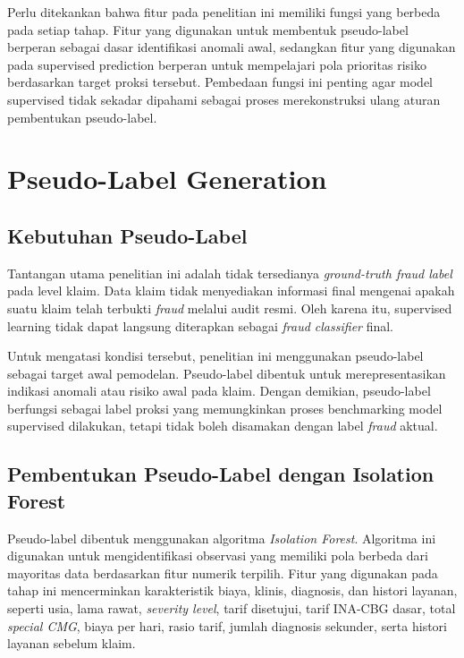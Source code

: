 Perlu ditekankan bahwa fitur pada penelitian ini memiliki fungsi yang berbeda pada setiap tahap. Fitur yang digunakan untuk membentuk pseudo-label berperan sebagai dasar identifikasi anomali awal, sedangkan fitur yang digunakan pada supervised prediction berperan untuk mempelajari pola prioritas risiko berdasarkan target proksi tersebut. Pembedaan fungsi ini penting agar model supervised tidak sekadar dipahami sebagai proses merekonstruksi ulang aturan pembentukan pseudo-label.

\section{Pseudo-Label Generation}\label{pseudo-label-generation}

\subsection{Kebutuhan Pseudo-Label}\label{kebutuhan-pseudo-label}

Tantangan utama penelitian ini adalah tidak tersedianya \emph{ground-truth fraud label} pada level klaim. Data klaim tidak menyediakan informasi final mengenai apakah suatu klaim telah terbukti \emph{fraud} melalui audit resmi. Oleh karena itu, supervised learning tidak dapat langsung diterapkan sebagai \emph{fraud classifier} final.

Untuk mengatasi kondisi tersebut, penelitian ini menggunakan pseudo-label sebagai target awal pemodelan. Pseudo-label dibentuk untuk merepresentasikan indikasi anomali atau risiko awal pada klaim. Dengan demikian, pseudo-label berfungsi sebagai label proksi yang memungkinkan proses benchmarking model supervised dilakukan, tetapi tidak boleh disamakan dengan label \emph{fraud} aktual.

\subsection{Pembentukan Pseudo-Label dengan Isolation Forest}\label{pembentukan-pseudo-label-dengan-isolation-forest}

Pseudo-label dibentuk menggunakan algoritma \emph{Isolation Forest}. Algoritma ini digunakan untuk mengidentifikasi observasi yang memiliki pola berbeda dari mayoritas data berdasarkan fitur numerik terpilih. Fitur yang digunakan pada tahap ini mencerminkan karakteristik biaya, klinis, diagnosis, dan histori layanan, seperti usia, lama rawat, \emph{severity level}, tarif disetujui, tarif INA-CBG dasar, total \emph{special CMG}, biaya per hari, rasio tarif, jumlah diagnosis sekunder, serta histori layanan sebelum klaim.

